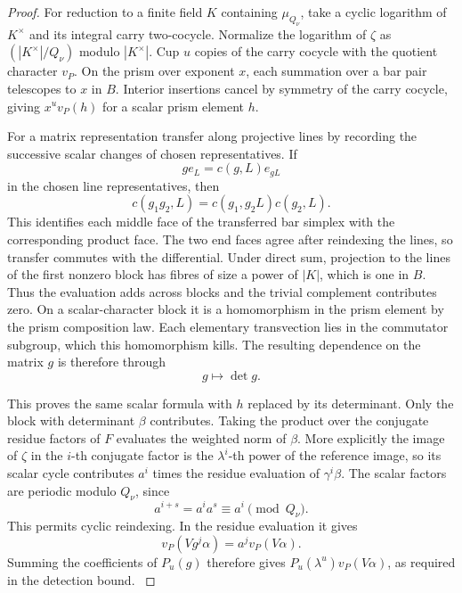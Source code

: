 \begin{proof}
For reduction to a finite field \(K\) containing
\(\mu_{Q_\nu}\), take a cyclic logarithm of \(K^\times\)
and its integral carry two-cocycle. Normalize the
logarithm of \(\zeta\) as \((|K^\times|/Q_\nu)\)
modulo \(|K^\times|\). Cup \(u\) copies of the
carry cocycle with the quotient character \(v_P\).
On the prism over exponent \(x\), each summation
over a bar pair telescopes to \(x\) in \(B\).
Interior insertions cancel by symmetry of the
carry cocycle, giving \(x^u v_P(h)\) for a scalar
prism element \(h\).

For a matrix representation transfer along projective
lines by recording the successive scalar changes of
chosen representatives. If
\[
 g e_L=c(g,L)e_{gL}
\]
in the chosen line representatives, then
\[
 c(g_1g_2,L)=c(g_1,g_2L)c(g_2,L).
\]
This identifies each middle face of the transferred bar simplex with the corresponding product face. The two end faces agree after reindexing the lines, so transfer commutes with the differential. Under direct sum, projection to the
lines of the first nonzero block has fibres of
size a power of \(|K|\), which is one in \(B\).
Thus the evaluation adds across blocks and the
trivial complement contributes zero. On a
scalar-character block it is a homomorphism in the
prism element by the prism composition law. Each elementary transvection lies in the commutator subgroup, which this homomorphism kills. The resulting dependence on the matrix \(g\) is therefore through
\[
 g\longmapsto\det g.
\]

This proves the same scalar formula with \(h\)
replaced by its determinant. Only the block with
determinant \(\beta\) contributes. Taking the product
over the conjugate residue factors of \(F\) evaluates
the weighted norm of \(\beta\). More explicitly the
image of \(\zeta\) in the \(i\)-th conjugate factor
is the \(\lambda^i\)-th power of the reference
image, so its scalar cycle contributes \(a^i\)
times the residue evaluation of \(\gamma^i\beta\).
The scalar factors are periodic modulo \(Q_\nu\), since
\[
 a^{i+s}=a^i a^s\equiv a^i\pmod{Q_\nu}.
\]
This permits cyclic reindexing. In the residue evaluation it gives
\[
       v_P(Vg^j\alpha)=a^j v_P(V\alpha).
\] Summing the coefficients
of \(P_u(g)\) therefore gives
\(P_u(\lambda^u)v_P(V\alpha)\), as required in
the detection bound.
\label{cor:cohomology-height-4}
\end{proof}
